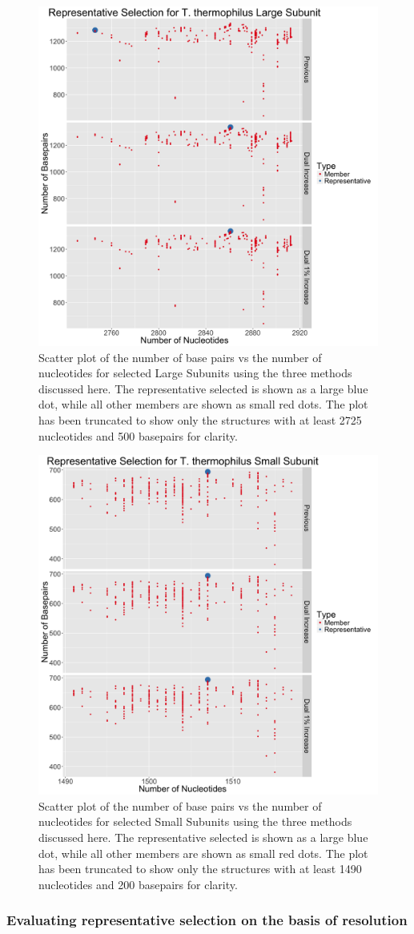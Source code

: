 \begin{figure}
  \includegraphics[width=0.5\linewidth]{chapter-4/figs/tt-lsu-rep}
  \caption{Scatter plot of the number of base pairs vs the number of nucleotides
    for selected \TT{} Large Subunits using the three methods
    discussed here. The representative selected is shown as a large blue dot,
    while all other members are shown as small red dots. The plot has been
    truncated to show only the structures with at least 2725 nucleotides and 500
  basepairs for clarity.}
\label{fig:tt-lsu-rep}
\end{figure}

\begin{figure}
  \includegraphics[width=0.5\linewidth]{chapter-4/figs/tt-ssu-rep}
  \caption{Scatter plot of the number of base pairs vs the number of nucleotides
    for selected \TT{} Small Subunits using the three methods
    discussed here. The representative selected is shown as a large blue dot,
    while all other members are shown as small red dots. The plot has been
    truncated to show only the structures with at least 1490 nucleotides and 200
  basepairs for clarity.}
\label{fig:tt-ssu-rep}
\end{figure}

\subsubsection{Evaluating representative selection on the basis of resolution}

